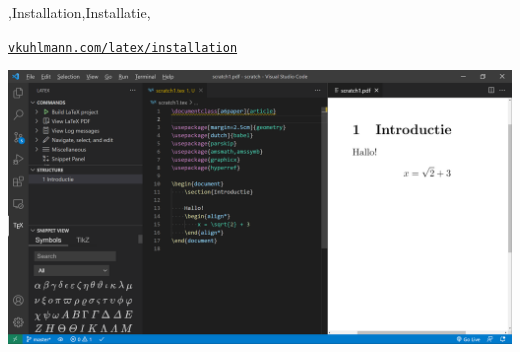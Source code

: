 \begin{frame}
    {\lang,Installation,Installatie,}

    \href{https://vkuhlmann.com/latex/installation}{\nolinkurl{vkuhlmann.com/latex/installation}}

    \includegraphics[width=\linewidth,height=0.8\textheight,keepaspectratio]{assets/Misc/VisualStudioCodeDemo.png}
\end{frame}

